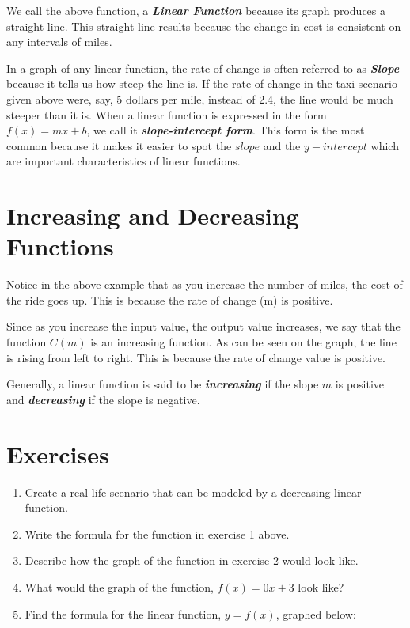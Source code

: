 \documentclass[
  letterpaper,
  DIV=11,
  numbers=noendperiod]{scrreprt}
\providecommand{\tightlist}{%
  \setlength{\itemsep}{0pt}\setlength{\parskip}{0pt}}\usepackage{longtable,booktabs,array}
\begin{document}
We call the above function, a \textbf{\emph{Linear Function}} because
its graph produces a straight line. This straight line results because
the change in cost is consistent on any intervals of miles.

In a graph of any linear function, the rate of change is often referred
to as \textbf{\emph{Slope}} because it tells us how steep the line is.
If the rate of change in the taxi scenario given above were, say, 5
dollars per mile, instead of 2.4, the line would be much steeper than it
is. When a linear function is expressed in the form \(f(x)=mx+b\), we
call it \textbf{\emph{slope-intercept form}}. This form is the most
common because it makes it easier to spot the \(slope\) and the
\(y-intercept\) which are important characteristics of linear functions.

\hypertarget{increasing-and-decreasing-functions}{%
\section{Increasing and Decreasing
Functions}\label{increasing-and-decreasing-functions}}

Notice in the above example that as you increase the number of miles,
the cost of the ride goes up. This is because the rate of change (m) is
positive.

Since as you increase the input value, the output value increases, we
say that the function \(C(m)\) is an increasing function. As can be seen
on the graph, the line is rising from left to right. This is because the
rate of change value is positive.

Generally, a linear function is said to be \textbf{\emph{increasing}} if
the slope \(m\) is positive and \textbf{\emph{decreasing}} if the slope
is negative.

\hypertarget{exercises}{%
\section{Exercises}\label{exercises}}

\begin{enumerate}
\def\labelenumi{\arabic{enumi}.}
\tightlist
\item
  Create a real-life scenario that can be modeled by a decreasing linear
  function.
\item
  Write the formula for the function in exercise 1 above.
\item
  Describe how the graph of the function in exercise 2 would look like.
\item
  What would the graph of the function, \(f(x)= 0x+3\) look like?
\item
  Find the formula for the linear function, \(y=f(x)\), graphed below:
\end{enumerate}
\end{document}
